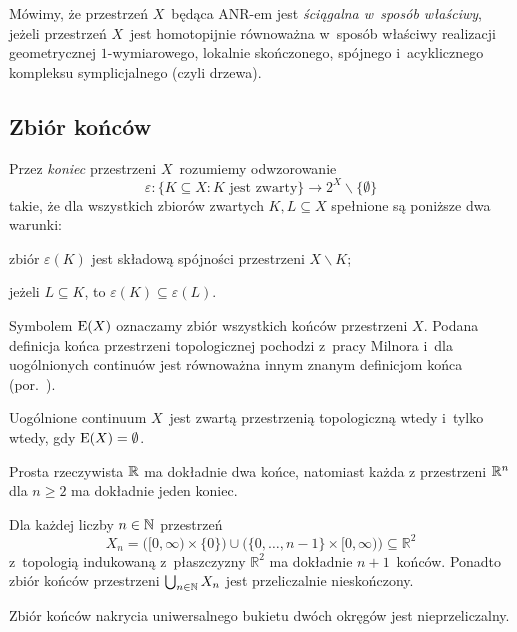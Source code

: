 Mówimy, że przestrzeń $X$~będąca ANR-em jest \textit{ściągalna w~sposób właściwy}, jeżeli przestrzeń $X$~jest homotopijnie równoważna w~sposób właściwy realizacji geometrycznej $1$-wymiarowego, lokalnie skończonego, spójnego i~acyklicznego kompleksu symplicjalnego (czyli drzewa).

\subsection{Zbiór końców}
Przez \textit{koniec} przestrzeni $X$~rozumiemy odwzorowanie \[\varepsilon\colon \{K\subseteq X:K\text{ jest zwarty}\}\to 2^X\smallsetminus \{\emptyset\}\] takie, że dla wszystkich zbiorów zwartych $K,L\subseteq X$ spełnione są poniższe dwa warunki:
\begin{compactenum}
\item zbiór $\varepsilon(K)$ jest składową spójności przestrzeni $X\smallsetminus K$;
\item jeżeli $L\subseteq K$, to $\varepsilon(K)\subseteq \varepsilon(L)$.
\end{compactenum}
Symbolem $\mathrm{E}(X)$ oznaczamy zbiór wszystkich końców przestrzeni $X$.
Podana definicja końca przestrzeni topologicznej pochodzi z~pracy Milnora \cite{Milnor68} i~dla uogólnionych continuów jest równoważna innym znanym definicjom końca (por.~\cite[Chapter~1]{Hughes96}).

\begin{ex}\noindent
\begin{compactenum}
\item Uogólnione continuum $X$~jest zwartą przestrzenią topologiczną wtedy i~tylko wtedy, gdy $\mathrm{E}(X)=\emptyset$.
\item Prosta rzeczywista $\mathbb{R}$ ma dokładnie dwa końce, natomiast każda z przestrzeni $\mathbb{R}^n$ dla $n\geq 2$ ma dokładnie jeden koniec.
\item Dla każdej liczby $n\in\mathbb{N}$ przestrzeń \[X_n=\bigl( [0,\infty)\times \{0\} \bigr) \cup \bigl(\{0,\ldots,n-1\}\times [0,\infty)\bigr)\subseteq \mathbb{R}^2\] z~topologią indukowaną z~płaszczyzny $\mathbb{R}^2$ ma dokładnie $n+1$~końców. Ponadto zbiór końców przestrzeni $\bigcup_{n\in\mathbb{N}} X_n$ jest przeliczalnie nieskończony.
\item Zbiór końców nakrycia uniwersalnego bukietu dwóch okręgów jest nieprzeliczalny.
\end{compactenum}
\end{ex}

